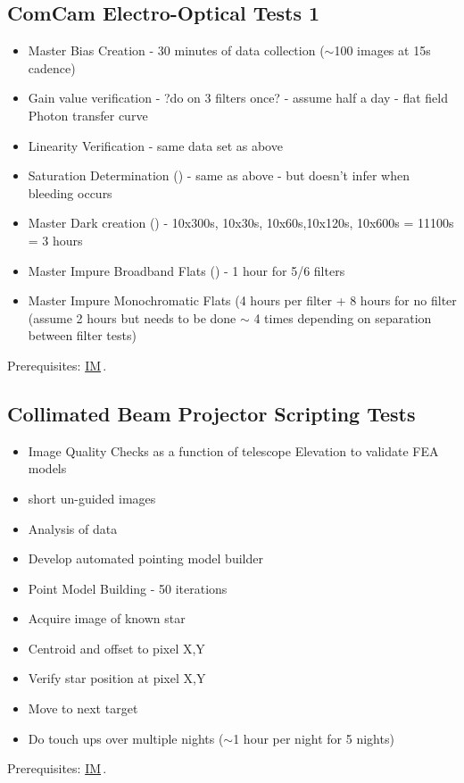 \documentclass[SE,authoryear,toc]{lsstdoc}
\newcommand{\IM}[1]{\hyperref[IM:#1]{\color{blue}IM$_{\text{\csname nameIM#1\endcsname}}$}}
\begin{document}
\subsection{ComCam Electro-Optical Tests 1}

\begin{itemize}
\item Master Bias Creation - 30 minutes of data collection ($\sim$100 images at 15s cadence)
\item Gain value verification - ?do on 3 filters once? - assume half a day - flat field Photon transfer curve
\item Linearity Verification - same data set as above
\item Saturation Determination () - same as above - but doesn't infer when bleeding occurs
\item Master Dark creation () - 10x300s, 10x30s, 10x60s,10x120s, 10x600s = 11100s = 3 hours
\item Master Impure Broadband Flats () - 1 hour for 5/6 filters
\item Master Impure Monochromatic Flats (4 hours per filter + 8 hours for no filter (assume 2 hours but needs to be done $\sim$ 4 times depending on separation between filter tests)
\end{itemize}
Prerequisites: \IM{b}.

\subsection{Collimated Beam Projector Scripting Tests}

\begin{itemize}
\item Image Quality Checks as a function of telescope Elevation to validate FEA models
\item short un-guided images
\item Analysis of data
\item Develop automated pointing model builder
\item Point Model Building - 50 iterations
\item Acquire image of known star
\item Centroid and offset to pixel X,Y
\item Verify star position at pixel X,Y
\item Move to next target
\item Do touch ups over multiple nights ($\sim$1 hour per night for 5 nights)
\end{itemize}
Prerequisites: \IM{cbp}.
\end{document}
